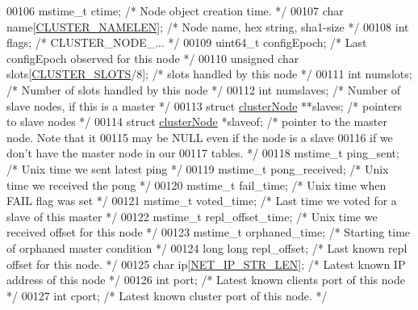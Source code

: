 \begin{DoxyCode}
00106     mstime\_t ctime; \textcolor{comment}{/* Node object creation time. */}
00107     \textcolor{keywordtype}{char} name[\hyperlink{cluster_8h_ace7a882972eff7149675252938643b6e}{CLUSTER\_NAMELEN}]; \textcolor{comment}{/* Node name, hex string, sha1-size */}
00108     \textcolor{keywordtype}{int} flags;      \textcolor{comment}{/* CLUSTER\_NODE\_... */}
00109     uint64\_t configEpoch; \textcolor{comment}{/* Last configEpoch observed for this node */}
00110     \textcolor{keywordtype}{unsigned} \textcolor{keywordtype}{char} slots[\hyperlink{cluster_8h_aa3e2cb951eebb16725ecc3f5beefd9fd}{CLUSTER\_SLOTS}/8]; \textcolor{comment}{/* slots handled by this node */}
00111     \textcolor{keywordtype}{int} numslots;   \textcolor{comment}{/* Number of slots handled by this node */}
00112     \textcolor{keywordtype}{int} numslaves;  \textcolor{comment}{/* Number of slave nodes, if this is a master */}
00113     \textcolor{keyword}{struct} \hyperlink{structclusterNode}{clusterNode} **slaves; \textcolor{comment}{/* pointers to slave nodes */}
00114     \textcolor{keyword}{struct} \hyperlink{structclusterNode}{clusterNode} *slaveof; \textcolor{comment}{/* pointer to the master node. Note that it}
00115 \textcolor{comment}{                                    may be NULL even if the node is a slave}
00116 \textcolor{comment}{                                    if we don't have the master node in our}
00117 \textcolor{comment}{                                    tables. */}
00118     mstime\_t ping\_sent;      \textcolor{comment}{/* Unix time we sent latest ping */}
00119     mstime\_t pong\_received;  \textcolor{comment}{/* Unix time we received the pong */}
00120     mstime\_t fail\_time;      \textcolor{comment}{/* Unix time when FAIL flag was set */}
00121     mstime\_t voted\_time;     \textcolor{comment}{/* Last time we voted for a slave of this master */}
00122     mstime\_t repl\_offset\_time;  \textcolor{comment}{/* Unix time we received offset for this node */}
00123     mstime\_t orphaned\_time;     \textcolor{comment}{/* Starting time of orphaned master condition */}
00124     \textcolor{keywordtype}{long} \textcolor{keywordtype}{long} repl\_offset;      \textcolor{comment}{/* Last known repl offset for this node. */}
00125     \textcolor{keywordtype}{char} ip[\hyperlink{server_8h_ad97c5405ed22a94e9fcc10fba577d6c0}{NET\_IP\_STR\_LEN}];  \textcolor{comment}{/* Latest known IP address of this node */}
00126     \textcolor{keywordtype}{int} port;                   \textcolor{comment}{/* Latest known clients port of this node */}
00127     \textcolor{keywordtype}{int} cport;                  \textcolor{comment}{/* Latest known cluster port of this node. */}

\end{DoxyCode}
